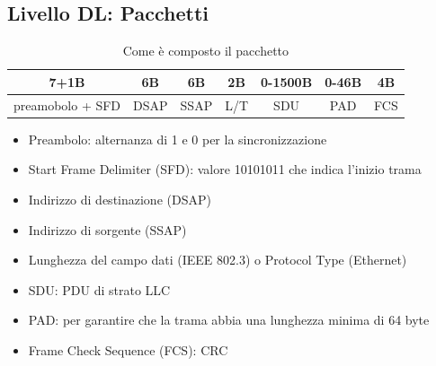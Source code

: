 \documentclass{book}
\begin{document}
\subsection{Livello DL: Pacchetti}
\begin{table}[h!]
	\centering
	\begin{tabular}{|c|c|c|c|c|c|c|}
		\multicolumn{1}{c}{7+1B}&\multicolumn{1}{c}{6B}&\multicolumn{1}{c}{6B}&\multicolumn{1}{c}{2B}&\multicolumn{1}{c}{0-1500B}&\multicolumn{1}{c}{0-46B}&\multicolumn{1}{c}{4B}\\
		\hline
	preamobolo + SFD&DSAP&SSAP&L/T&SDU&PAD&FCS\\\hline
		
	\end{tabular}
	\caption{Come è composto il pacchetto}
\end{table}
\begin{itemize}
	\item Preambolo: alternanza di 1 e 0 per la sincronizzazione
	\item Start Frame Delimiter (SFD): valore 10101011 che indica l'inizio
		trama
	\item Indirizzo di destinazione (DSAP)
	\item Indirizzo di sorgente (SSAP)
	\item Lunghezza del campo dati (IEEE 802.3) o Protocol Type (Ethernet)
	\item SDU: PDU di strato LLC
	\item PAD: per garantire che la trama abbia una lunghezza minima di 64 byte
	\item Frame Check Sequence (FCS): CRC
\end{itemize}
\end{document}
